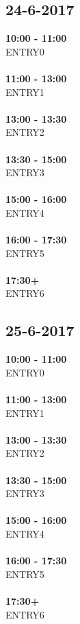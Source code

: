 \documentclass{uva-inf-article}
\begin{document}
\subsection{24-6-2017}
\textbf{10:00 - 11:00}\\
ENTRY0\\\\
\textbf{11:00 - 13:00}\\
ENTRY1\\\\
\textbf{13:00 - 13:30}\\
ENTRY2\\\\
\textbf{13:30 - 15:00}\\
ENTRY3\\\\
\textbf{15:00 - 16:00}\\
ENTRY4\\\\
\textbf{16:00 - 17:30}\\
ENTRY5\\\\
\textbf{17:30+}\\
ENTRY6\\
\subsection{25-6-2017}
\textbf{10:00 - 11:00}\\
ENTRY0\\\\
\textbf{11:00 - 13:00}\\
ENTRY1\\\\
\textbf{13:00 - 13:30}\\
ENTRY2\\\\
\textbf{13:30 - 15:00}\\
ENTRY3\\\\
\textbf{15:00 - 16:00}\\
ENTRY4\\\\
\textbf{16:00 - 17:30}\\
ENTRY5\\\\
\textbf{17:30+}\\
ENTRY6\\
\end{document}
